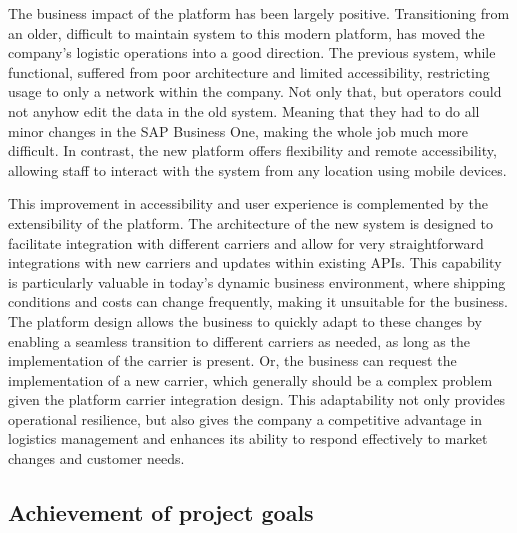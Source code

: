 The business impact of the platform has been largely positive.
Transitioning from an older, difficult to maintain system to this modern platform, has moved the company's logistic operations into a good direction.
The previous system, while functional, suffered from poor architecture and limited accessibility, restricting usage to only a network within the company.
Not only that, but operators could not anyhow edit the data in the old system. 
Meaning that they had to do all minor changes in the SAP Business One, making the whole job much more difficult. 
In contrast, the new platform offers flexibility and remote accessibility, allowing staff to interact with the system from any location using mobile devices.

This improvement in accessibility and user experience is complemented by the extensibility of the platform. 
The architecture of the new system is designed to facilitate integration with different carriers and allow for very straightforward integrations with new carriers and updates within existing APIs. 
This capability is particularly valuable in today's dynamic business environment, where shipping conditions and costs can change frequently, making it unsuitable for the business.
The platform design allows the business to quickly adapt to these changes by enabling a seamless transition to different carriers as needed, as long as the implementation of the carrier is present.
Or, the business can request the implementation of a new carrier, which generally should be a complex problem given the platform carrier integration design. 
This adaptability not only provides operational resilience, but also gives the company a competitive advantage in logistics management and enhances its ability to respond effectively to market changes and customer needs.


\subsection{Achievement of project goals}
\label{subsec:achievement-project-goals}

